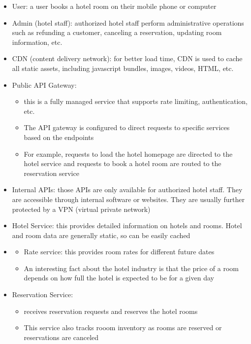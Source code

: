 \documentclass{report}
\theoremstyle{definition}
\begin{document}
\begin{itemize}
\item
User: a user books a hotel room on their mobile phone or computer
\item
Admin (hotel staff): authorized hotel staff perform administrative operations such as refunding a customer, canceling a reservation, updating room information, etc.
\item
CDN (content delivery network): for better load time, CDN is used to cache all static assets, including javascript bundles, images, videos, HTML, etc.
\item
Public API Gateway:

\begin{itemize}
\item
this is a fully managed service that supports rate limiting, authentication, etc.
\item
The API gateway is configured to direct requests to specific services based on the endpoints
\item
For example, requests to load the hotel homepage are directed to the hotel service and requests to book a hotel room are routed to the reservation service
\end{itemize}
\item
Internal APIs: those APIs are only available for authorized hotel staff. They are accessible through internal software or websites. They are usually further protected by a VPN (virtual private network)
\item
Hotel Service: this provides detailed information on hotels and rooms. Hotel and room data are generally static, so can be easily cached
\item

\begin{itemize}
\item
Rate service: this provides room rates for different future dates
\item
An interesting fact about the hotel industry is that the price of a room depends on how full the hotel is expected to be for a given day
\end{itemize}

\item
Reservation Service:

\begin{itemize}
\item
receives reservation requests and reserves the hotel rooms
\item
This service also tracks rooom inventory as rooms are reserved or reservations are canceled
\end{itemize}


\end{itemize}
\end{document}
